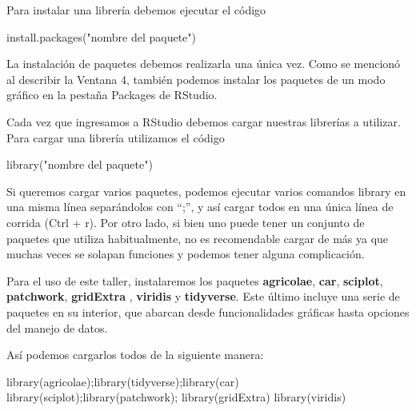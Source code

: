 \documentclass[
  letterpaper,
  DIV=11,
  numbers=noendperiod]{scrartcl}
\newenvironment{Shaded}{\begin{snugshade}}{\end{snugshade}}
\newcommand{\FunctionTok}[1]{\textcolor[rgb]{0.28,0.35,0.67}{#1}}
\newcommand{\NormalTok}[1]{\textcolor[rgb]{0.00,0.23,0.31}{#1}}
\newcommand{\StringTok}[1]{\textcolor[rgb]{0.13,0.47,0.30}{#1}}
\begin{document}
Para instalar una librería debemos ejecutar el código

\begin{Shaded}
\begin{Highlighting}[]
\FunctionTok{install.packages}\NormalTok{(}\StringTok{"nombre del paquete"}\NormalTok{)}
\end{Highlighting}
\end{Shaded}

La instalación de paquetes debemos realizarla una única vez. Como se
mencionó al describir la Ventana 4, también podemos instalar los
paquetes de un modo gráfico en la pestaña Packages de RStudio.

Cada vez que ingresamos a RStudio debemos cargar nuestras librerías a
utilizar. Para cargar una librería utilizamos el código

\begin{Shaded}
\begin{Highlighting}[]
\FunctionTok{library}\NormalTok{(}\StringTok{"nombre del paquete"}\NormalTok{)}
\end{Highlighting}
\end{Shaded}

Si queremos cargar varios paquetes, podemos ejecutar varios comandos
library en una misma línea separándolos con ``;'', y así cargar todos en
una única línea de corrida (Ctrl + r). Por otro lado, si bien uno puede
tener un conjunto de paquetes que utiliza habitualmente, no es
recomendable cargar de más ya que muchas veces se solapan funciones y
podemos tener alguna complicación.

Para el uso de este taller, instalaremos los paquetes
\textbf{agricolae}, \textbf{car}, \textbf{sciplot}, \textbf{patchwork},
\textbf{gridExtra} , \textbf{viridis} y \textbf{tidyverse}. Este último
incluye una serie de paquetes en su interior, que abarcan desde
funcionalidades gráficas hasta opciones del manejo de datos.

Así podemos cargarlos todos de la siguiente manera:

\begin{Shaded}
\begin{Highlighting}[]
\FunctionTok{library}\NormalTok{(agricolae);}\FunctionTok{library}\NormalTok{(tidyverse);}\FunctionTok{library}\NormalTok{(car)}
\FunctionTok{library}\NormalTok{(sciplot);}\FunctionTok{library}\NormalTok{(patchwork); }\FunctionTok{library}\NormalTok{(gridExtra)}
\FunctionTok{library}\NormalTok{(viridis)}
\end{Highlighting}
\end{Shaded}
\end{document}
